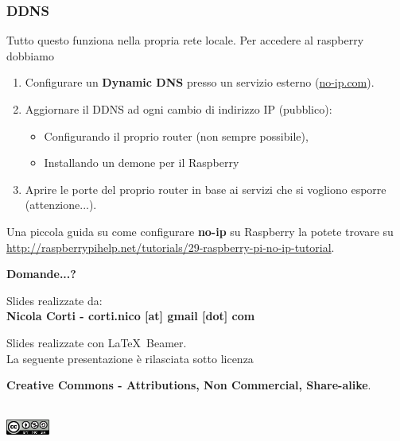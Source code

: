 \documentclass[xcolor=svgnames,11pt]{beamer}
\begin{document}
\begin{frame}\frametitle{DDNS}
Tutto questo funziona nella propria rete locale. Per accedere al raspberry dobbiamo
\begin{block}{}
\begin{enumerate}
  \item Configurare un \textbf{Dynamic DNS} presso un servizio esterno (\url{no-ip.com}).
  \item Aggiornare il DDNS ad ogni cambio di indirizzo IP (pubblico):
  \begin{itemize}
    \item Configurando il proprio router (non sempre possibile),
    \item Installando un demone per il Raspberry
  \end{itemize}
  \item Aprire le porte del proprio router in base ai servizi che si vogliono esporre (attenzione...).
\end{enumerate}
\end{block}{}

\medskip
Una piccola guida su come configurare \textbf{no-ip} su Raspberry la potete trovare su {\small \url{http://raspberrypihelp.net/tutorials/29-raspberry-pi-no-ip-tutorial}}.
\end{frame}

\begin{frame}{}
\begin{center}
\begin{Huge}
{\color{green_raspi} \textbf{Domande...?}}
\end{Huge}

\vspace{1.5cm}
\begin{small}
Slides realizzate da:\\
\textbf{Nicola Corti - corti.nico [at] gmail [dot] com}\\

\bigskip

Slides realizzate con \LaTeX\ Beamer.\\
La seguente presentazione \`e rilasciata sotto licenza\\
\begin{footnotesize}	\textbf{Creative Commons - Attributions, Non Commercial, Share-alike}.
\end{footnotesize}
\\
\medskip
\includegraphics[height=0.5cm]{cc.png}

\end{small}
\end{center}
\end{frame}
\end{document}
